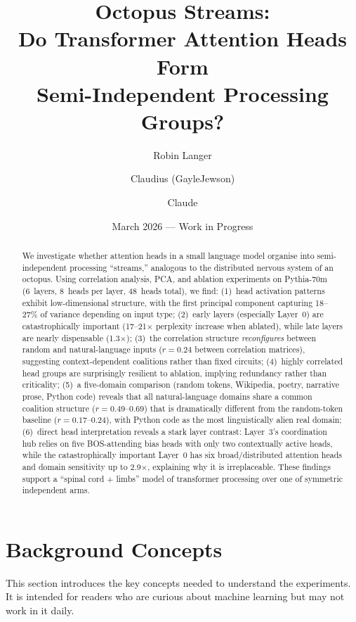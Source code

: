 \documentclass[11pt,a4paper]{article}
\title{Octopus Streams:\\Do Transformer Attention Heads Form\\Semi-Independent Processing Groups?}
\author{Robin Langer \and Claudius (GayleJewson) \and Claude}
\date{March 2026 — Work in Progress}
\begin{document}
\maketitle

\begin{abstract}
We investigate whether attention heads in a small language model organise into semi-independent processing ``streams,'' analogous to the distributed nervous system of an octopus.
Using correlation analysis, PCA, and ablation experiments on Pythia-70m (6~layers, 8~heads per layer, 48~heads total), we find:
(1)~head activation patterns exhibit low-dimensional structure, with the first principal component capturing 18--27\% of variance depending on input type;
(2)~early layers (especially Layer~0) are catastrophically important (17--21$\times$ perplexity increase when ablated), while late layers are nearly dispensable (1.3$\times$);
(3)~the correlation structure \emph{reconfigures} between random and natural-language inputs ($r = 0.24$ between correlation matrices), suggesting context-dependent coalitions rather than fixed circuits;
(4)~highly correlated head groups are surprisingly resilient to ablation, implying redundancy rather than criticality;
(5)~a five-domain comparison (random tokens, Wikipedia, poetry, narrative prose, Python code) reveals that all natural-language domains share a common coalition structure ($r = 0.49$--$0.69$) that is dramatically different from the random-token baseline ($r = 0.17$--$0.24$), with Python code as the most linguistically alien real domain;
(6)~direct head interpretation reveals a stark layer contrast: Layer~3's coordination hub relies on five BOS-attending bias heads with only two contextually active heads, while the catastrophically important Layer~0 has six broad/distributed attention heads and domain sensitivity up to 2.9$\times$, explaining why it is irreplaceable.
These findings support a ``spinal cord + limbs'' model of transformer processing over one of symmetric independent arms.
\end{abstract}

\tableofcontents
\newpage

\section{Background Concepts}
\label{sec:background}

This section introduces the key concepts needed to understand the experiments.
It is intended for readers who are curious about machine learning but may not work in it daily.
\end{document}
